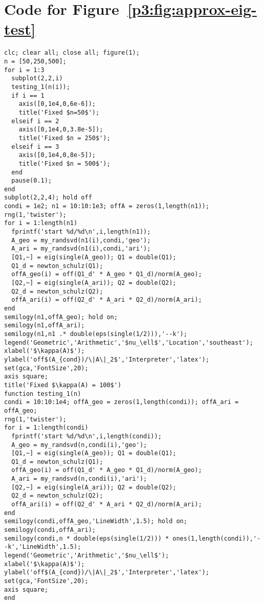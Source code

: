 \section{Code for Figure~\ref{p3:fig:approx-eig-test}}
\label{p3:sec:figure1}
\begin{lstlisting}
clc; clear all; close all; figure(1);
n = [50,250,500];
for i = 1:3
  subplot(2,2,i)
  testing_1(n(i));
  if i == 1
    axis([0,1e4,0,6e-6]);
    title('Fixed $n=50$');
  elseif i == 2
    axis([0,1e4,0,3.8e-5]);
    title('Fixed $n = 250$');
  elseif i == 3
    axis([0,1e4,0,8e-5]);
    title('Fixed $n = 500$');
  end
  pause(0.1);
end
subplot(2,2,4); hold off
condi = 1e2; n1 = 10:10:1e3; offA = zeros(1,length(n1)); rng(1,'twister');
for i = 1:length(n1)
  fprintf('start %d/%d\n',i,length(n1));
  A_geo = my_randsvd(n1(i),condi,'geo');
  A_ari = my_randsvd(n1(i),condi,'ari');
  [Q1,~] = eig(single(A_geo)); Q1 = double(Q1);
  Q1_d = newton_schulz(Q1);
  offA_geo(i) = off(Q1_d' * A_geo * Q1_d)/norm(A_geo);
  [Q2,~] = eig(single(A_ari)); Q2 = double(Q2);
  Q2_d = newton_schulz(Q2);
  offA_ari(i) = off(Q2_d' * A_ari * Q2_d)/norm(A_ari);
end
semilogy(n1,offA_geo); hold on;
semilogy(n1,offA_ari);
semilogy(n1,n1 .* double(eps(single(1/2))),'--k');
legend('Geometric','Arithmetic','$nu_\ell$','Location','southeast');
xlabel('$\kappa(A)$'); ylabel('off$(A_{cond})/\|A\|_2$','Interpreter','latex');
set(gca,'FontSize',20);
axis square;
title('Fixed $\kappa(A) = 100$')
function testing_1(n)
condi = 10:10:1e4; offA_geo = zeros(1,length(condi)); offA_ari = offA_geo;
rng(1,'twister');
for i = 1:length(condi)
  fprintf('start %d/%d\n',i,length(condi));
  A_geo = my_randsvd(n,condi(i),'geo');
  [Q1,~] = eig(single(A_geo)); Q1 = double(Q1);
  Q1_d = newton_schulz(Q1);
  offA_geo(i) = off(Q1_d' * A_geo * Q1_d)/norm(A_geo);
  A_ari = my_randsvd(n,condi(i),'ari');
  [Q2,~] = eig(single(A_ari)); Q2 = double(Q2);
  Q2_d = newton_schulz(Q2);
  offA_ari(i) = off(Q2_d' * A_ari * Q2_d)/norm(A_ari);
end
semilogy(condi,offA_geo,'LineWidth',1.5); hold on;
semilogy(condi,offA_ari);
semilogy(condi,n * double(eps(single(1/2))) * ones(1,length(condi)),'--k','LineWidth',1.5);
legend('Geometric','Arithmetic','$nu_\ell$');
xlabel('$\kappa(A)$'); ylabel('off$(A_{cond})/\|A\|_2$','Interpreter','latex');
set(gca,'FontSize',20);
axis square;
end
\end{lstlisting}

